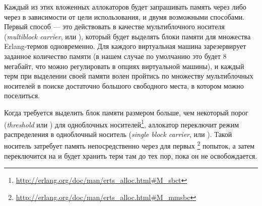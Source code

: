 \documentclass[11pt, oneside]{book}   	%
\begin{document}
Каждый из этих вложенных аллокаторов будет запрашивать память через  либо через  в зависимости от цели использования, и двумя возможными способами. Первый способ --- это действовать в качестве мультиблочного носителя (\emph{multiblock carrier}, или ), который будет выделять блоки памяти для множества Erlang-термов одновременно. Для каждого  виртуальная машина зарезервирует заданное количество памяти (в нашем случае по умолчанию это будет 8 мегабайт, что можно регулировать в опциях виртуальной машины), и каждый терм при выделении своей памяти волен пройтись по множеству мультиблочных носителей в поиске достаточно большого свободного места, в котором можно поселиться.

Когда требуется выделить блок памяти размером больше, чем некоторый порог (\emph{threshold} или ) для одноблочных носителей\footnote{\href{http://erlang.org/doc/man/erts\_alloc.html\#M\_sbct}{http://erlang.org/doc/man/erts\_alloc.html\#M\_sbct}}, аллокатор переключит режим распределения в одноблочный носитель (\emph{single block carrier}, или ). Такой носитель затребует память непосредственно через  для первых \footnote{\href{http://erlang.org/doc/man/erts\_alloc.html\#M\_mmsbc}{http://erlang.org/doc/man/erts\_alloc.html\#M\_mmsbc}} попыток, а затем переключится на  и будет хранить терм там до тех пор, пока он не освобождается.
\end{document}
